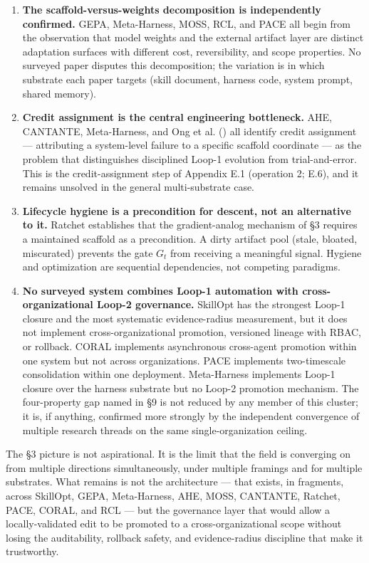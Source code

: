 \documentclass[
]{article}
\begin{document}
\begin{enumerate}
\def\labelenumi{\arabic{enumi}.}
\item
  \textbf{The scaffold-versus-weights decomposition is independently
  confirmed.} GEPA, Meta-Harness, MOSS, RCL, and PACE all begin from the
  observation that model weights and the external artifact layer are
  distinct adaptation surfaces with different cost, reversibility, and
  scope properties. No surveyed paper disputes this decomposition; the
  variation is in which substrate each paper targets (skill document,
  harness code, system prompt, shared memory).
\item
  \textbf{Credit assignment is the central engineering bottleneck.} AHE,
  CANTANTE, Meta-Harness, and Ong et al.
  () all identify credit
  assignment --- attributing a system-level failure to a specific
  scaffold coordinate --- as the problem that distinguishes disciplined
  Loop-1 evolution from trial-and-error. This is the credit-assignment
  step of Appendix E.1 (operation 2; E.6), and it remains unsolved in
  the general multi-substrate case.
\item
  \textbf{Lifecycle hygiene is a precondition for descent, not an
  alternative to it.} Ratchet establishes that the gradient-analog
  mechanism of §3 requires a maintained scaffold as a precondition. A
  dirty artifact pool (stale, bloated, miscurated) prevents the gate
  \(G_t\) from receiving a meaningful signal. Hygiene and optimization
  are sequential dependencies, not competing paradigms.
\item
  \textbf{No surveyed system combines Loop-1 automation with
  cross-organizational Loop-2 governance.} SkillOpt has the strongest
  Loop-1 closure and the most systematic evidence-radius measurement,
  but it does not implement cross-organizational promotion, versioned
  lineage with RBAC, or rollback. CORAL implements asynchronous
  cross-agent promotion within one system but not across organizations.
  PACE implements two-timescale consolidation within one deployment.
  Meta-Harness implements Loop-1 closure over the harness substrate but
  no Loop-2 promotion mechanism. The four-property gap named in §9 is
  not reduced by any member of this cluster; it is, if anything,
  confirmed more strongly by the independent convergence of multiple
  research threads on the same single-organization ceiling.
\end{enumerate}

The §3 picture is not aspirational. It is the limit that the field is
converging on from multiple directions simultaneously, under multiple
framings and for multiple substrates. What remains is not the
architecture --- that exists, in fragments, across SkillOpt, GEPA,
Meta-Harness, AHE, MOSS, CANTANTE, Ratchet, PACE, CORAL, and RCL --- but
the governance layer that would allow a locally-validated edit to be
promoted to a cross-organizational scope without losing the
auditability, rollback safety, and evidence-radius discipline that make
it trustworthy.
\end{document}

